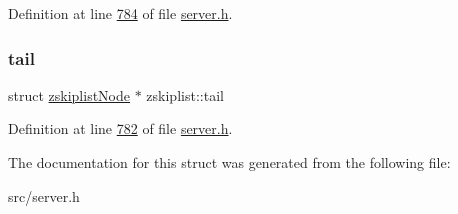 Definition at line \hyperlink{server_8h_source_l00784}{784} of file \hyperlink{server_8h_source}{server.\+h}.

\mbox{\label{structzskiplist_a509b215efb685501673262b8dfc6f520}} 
\subsubsection{\texorpdfstring{tail}{tail}}
{\footnotesize\ttfamily struct \hyperlink{structzskiplistNode}{zskiplist\+Node} $\ast$ zskiplist\+::tail}



Definition at line \hyperlink{server_8h_source_l00782}{782} of file \hyperlink{server_8h_source}{server.\+h}.



The documentation for this struct was generated from the following file\+:\begin{DoxyCompactItemize}
\item 
src/server.\+h\end{DoxyCompactItemize}
